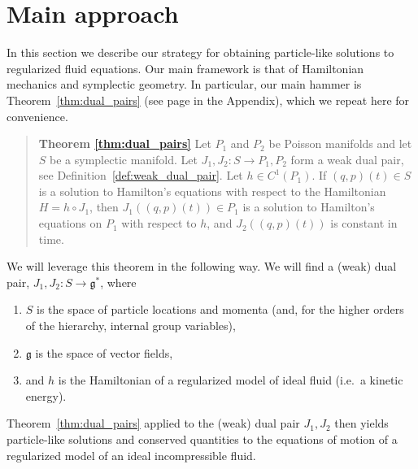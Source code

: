 \documentclass[12pt]{amsart}
\begin{document}
\section{Main approach}
\label{sec:approach}
In this section we describe our strategy for obtaining
particle-like solutions to regularized fluid equations.
Our main framework is that of Hamiltonian mechanics
and symplectic geometry.
In particular, our main hammer is Theorem~\ref{thm:dual_pairs} (see page
\pageref{thm:dual_pairs} in the Appendix), which we repeat
here for convenience.
  \begin{quote}
    {\bf Theorem \ref{thm:dual_pairs}}
    Let $P_1$ and $P_2$ be Poisson manifolds and let $S$ be
    a symplectic manifold.  Let $J_1,J_2:S \to P_1,P_2$ form a weak dual pair,
    see Definition~\ref{def:weak_dual_pair}.
    Let $h \in C^1(P_1)$.
    If $(q,p)(t) \in S$ is a solution to Hamilton's equations
    with respect to the Hamiltonian $H = h \circ J_1$,
    then $J_1\left( (q,p)(t) \right) \in P_1$ is a solution
    to Hamilton's equations on $P_1$ with respect to $h$,
    and $J_2( (q,p)(t))$ is constant in time.
  \end{quote}

We will leverage this theorem in the following way.
We will find a (weak) dual pair, $J_1,J_2: S \to \mathfrak{g}^*$, where
\begin{enumerate}
\item $S$ is the space of particle locations and momenta (and, for the higher orders of the hierarchy, internal group variables),
\item $\mathfrak{g}$ is the space of vector fields,
\item and $h$ is the Hamiltonian of a regularized model of ideal fluid (i.e.\ a kinetic energy).
\end{enumerate}
Theorem~\ref{thm:dual_pairs} applied to the (weak) dual pair $J_1,J_2$
then yields particle-like solutions and conserved quantities to the equations of motion
of a regularized model of an ideal incompressible fluid.
\end{document}
